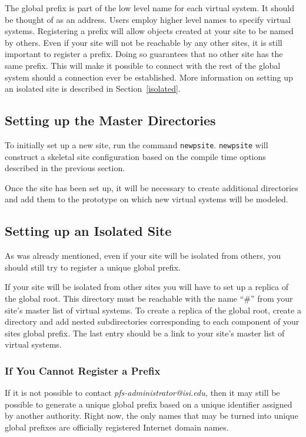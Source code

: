 The global prefix is part of the low level name for each virtual
system.  It should be thought of as an address.  Users employ higher
level names to specify virtual systems.  Registering a prefix will
allow objects created at your site to be named by others.  Even if
your site will not be reachable by any other sites, it is still
important to register a prefix.  Doing so guarantees that no other
site has the same prefix.  This will make it possible to connect with
the rest of the global system should a connection ever be established.
More information on setting up an isolated site is described in
Section~\ref{isolated}.

\subsection{Setting up the Master Directories}

To initially set up a new site, run the command {\tt newpsite}.  
{\tt newpsite} will construct a skeletal site configuration based on the
compile time options described in the previous section.

Once the site has been set up, it will be necessary to create
additional directories and add them to the prototype on which new
virtual systems will be modeled.

\subsection{Setting up an Isolated Site\label{isolated}}

As was already mentioned, even if your site will be isolated from
others, you should still try to register a unique global prefix.  

If your site will be isolated from other sites you will have to set up
a replica of the global root.  This directory must be reachable with
the name ``\#'' from your site's master list of virtual systems.  To
create a replica of the global root, create a directory and add nested
subdirectories corresponding to each component of your sites global
prefix. The last entry should be a link to your site's master list of
virtual systems.

\subsubsection{If You Cannot Register a Prefix\label{no_prefix}}

If it is not possible to contact {\it
pfs-administrator@isi.edu,} then it may still be possible to
generate a unique global prefix based on a unique identifier assigned
by another authority.  Right now, the only names that may be turned
into unique global prefixes are officially registered Internet domain
names.

